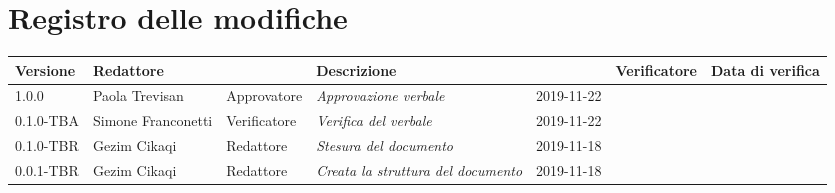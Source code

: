 \section*{Registro delle modifiche}
\renewcommand{\arraystretch}{1.8}

  \begin{longtable}{|p{1.5cm}|p{1.7cm}|p{2cm}|p{2cm}|p{1.7cm}|p{2cm}|p{2.7cm}|}
    \hline
    \rowcolor{header}
    \textbf{Versione} & \textbf{Redattore} & \centering{\textbf{Ruolo}} & \textbf{Descrizione} &      \centering{\textbf{Data}} & \textbf{Verificatore} & \textbf{Data di verifica} \\

    \hline

    1.0.0 & Paola Trevisan & Approvatore & \small{\textit{Approvazione verbale}} & 2019-11-22 & & \\
    0.1.0-TBA & Simone Franconetti & Verificatore & \small{\textit{Verifica del verbale }} & 2019-11-22 & & \\
    0.1.0-TBR & Gezim Cikaqi & Redattore & \small{\textit{Stesura del documento}} & 2019-11-18 & & \\
    0.0.1-TBR & Gezim Cikaqi & Redattore & \small{\textit{Creata la struttura del documento}} & 2019-11-18 & & \\

    \hline
  \end{longtable}
